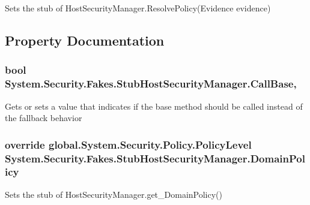 Sets the stub of Host\-Security\-Manager.\-Resolve\-Policy(\-Evidence evidence)



\subsection{Property Documentation}
\hypertarget{class_system_1_1_security_1_1_fakes_1_1_stub_host_security_manager_aecef38ec41818f1e2f150bc37762e745}{
\subsubsection[{Call\-Base}]{\setlength{\rightskip}{0pt plus 5cm}bool System.\-Security.\-Fakes.\-Stub\-Host\-Security\-Manager.\-Call\-Base\hspace{0.3cm}{\ttfamily [get]}, {\ttfamily [set]}}}\label{class_system_1_1_security_1_1_fakes_1_1_stub_host_security_manager_aecef38ec41818f1e2f150bc37762e745}


Gets or sets a value that indicates if the base method should be called instead of the fallback behavior

\hypertarget{class_system_1_1_security_1_1_fakes_1_1_stub_host_security_manager_ac3b130d914d080ec8638d75eaf1cdd08}{
\subsubsection[{Domain\-Policy}]{\setlength{\rightskip}{0pt plus 5cm}override global.\-System.\-Security.\-Policy.\-Policy\-Level System.\-Security.\-Fakes.\-Stub\-Host\-Security\-Manager.\-Domain\-Policy\hspace{0.3cm}{\ttfamily [get]}}}\label{class_system_1_1_security_1_1_fakes_1_1_stub_host_security_manager_ac3b130d914d080ec8638d75eaf1cdd08}


Sets the stub of Host\-Security\-Manager.\-get\-\_\-\-Domain\-Policy()

